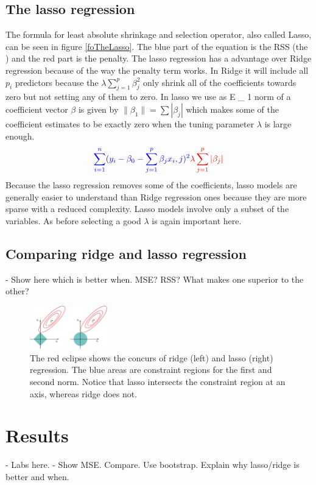 \subsection{The lasso regression}
The formula for least absolute shrinkage and selection operator, also called Lasso, can be seen in figure \ref{foTheLasso}. The blue part of the equation is the RSS (the ) and the red part is the penalty. The lasso regression has a advantage over Ridge regression because of the way the penalty term works. In Ridge it will include all $p_i$ predictors because the $\lambda \sum_{j=1}^{p} \beta^2_j$ only shrink all of the coefficients towards zero but not setting any of them to zero. In lasso we use as E \_ 1 norm of a coefficient vector $\beta$ is given by $ \lVert \beta_1 \rVert = \sum | \beta_j |$ which makes some of the coefficient estimates to be exactly zero when the tuning parameter $\lambda$ is large enough.
\begin{align}\label{fo:TheLasso}
\color{blue} \sum_{i=1}^{n} ( y_i - \beta_0 - \sum_{j=1}^{p} \beta_j x_i,j )^2  \color{red} \lambda \sum_{j=1}^{p} |\beta_j|
\end{align}
Because the lasso regression removes some of the coefficients, lasso models are generally easier to understand than Ridge regression ones because they are  more sparse with a reduced complexity. Lasso models involve only a subset of the variables. As before selecting a good $\lambda$ is again important here.

\subsection{Comparing ridge and lasso regression}

- Show here which is better when. MSE? RSS? What makes one superior to the other?


\begin{figure}[H]
	\centering
	\includegraphics[width=0.3\textwidth]{shrinkageMethods/fig/normsL1_L2.jpg}
	\caption{The red eclipse shows the concurs of ridge (left) and lasso (right) regression. The blue areas are constraint regions for the first and second norm. Notice that lasso intersects the constraint region at an axis, whereas ridge does not.}
	\label{fig:normfirstsecond}
\end{figure}

\section{Results}

- Labs here.
- Show MSE. Compare. Use bootstrap. Explain why lasso/ridge is better and when.